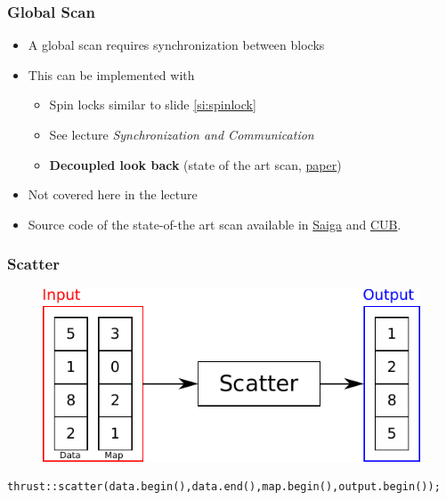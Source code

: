 \documentclass[aspectratio=169]{beamer}
\begin{document}
\begin{frame}[fragile]
\frametitle{Global Scan}
\begin{itemize}
	\item A global scan requires synchronization between blocks
	\item<2-> This can be implemented with
	\begin{itemize}
		\item<2-> Spin locks similar to slide \ref{si:spinlock}
		\item<2->[$\rightarrow$] See lecture \textit{Synchronization and Communication}
		\item<3-> \textbf{Decoupled look back} (state of the art scan, \href{https://research.nvidia.com/sites/default/files/pubs/2016-03_Single-pass-Parallel-Prefix/nvr-2016-002.pdf}{paper})
	\end{itemize} 
	\item<3-> Not covered here in the lecture
	\item<4-> Source code of the state-of-the art scan available in \href{https://github.com/darglein/saiga/blob/master/src/saiga/cuda/scan.h}{Saiga} and \href{https://nvlabs.github.io/cub/structcub_1_1_device_scan.html}{CUB}.
\end{itemize}
\end{frame}

\begin{frame}[fragile]
\frametitle{Scatter}
\begin{figure}
	\centering
	\includegraphics[height=0.6\textheight]{o_scatter}
\end{figure}

\begin{lstlisting}
thrust::scatter(data.begin(),data.end(),map.begin(),output.begin());
\end{lstlisting}
\end{frame}
\end{document}
